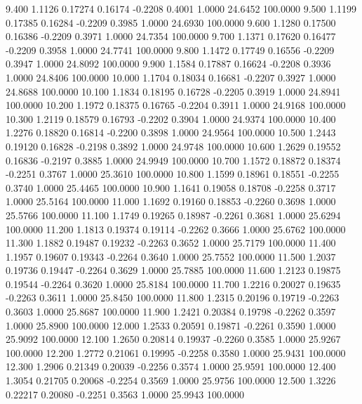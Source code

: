    9.400   1.1126   0.17274   0.16174  -0.2208   0.4001   1.0000  24.6452 100.0000
   9.500   1.1199   0.17385   0.16284  -0.2209   0.3985   1.0000  24.6930 100.0000
   9.600   1.1280   0.17500   0.16386  -0.2209   0.3971   1.0000  24.7354 100.0000
   9.700   1.1371   0.17620   0.16477  -0.2209   0.3958   1.0000  24.7741 100.0000
   9.800   1.1472   0.17749   0.16556  -0.2209   0.3947   1.0000  24.8092 100.0000
   9.900   1.1584   0.17887   0.16624  -0.2208   0.3936   1.0000  24.8406 100.0000
  10.000   1.1704   0.18034   0.16681  -0.2207   0.3927   1.0000  24.8688 100.0000
  10.100   1.1834   0.18195   0.16728  -0.2205   0.3919   1.0000  24.8941 100.0000
  10.200   1.1972   0.18375   0.16765  -0.2204   0.3911   1.0000  24.9168 100.0000
  10.300   1.2119   0.18579   0.16793  -0.2202   0.3904   1.0000  24.9374 100.0000
  10.400   1.2276   0.18820   0.16814  -0.2200   0.3898   1.0000  24.9564 100.0000
  10.500   1.2443   0.19120   0.16828  -0.2198   0.3892   1.0000  24.9748 100.0000
  10.600   1.2629   0.19552   0.16836  -0.2197   0.3885   1.0000  24.9949 100.0000
  10.700   1.1572   0.18872   0.18374  -0.2251   0.3767   1.0000  25.3610 100.0000
  10.800   1.1599   0.18961   0.18551  -0.2255   0.3740   1.0000  25.4465 100.0000
  10.900   1.1641   0.19058   0.18708  -0.2258   0.3717   1.0000  25.5164 100.0000
  11.000   1.1692   0.19160   0.18853  -0.2260   0.3698   1.0000  25.5766 100.0000
  11.100   1.1749   0.19265   0.18987  -0.2261   0.3681   1.0000  25.6294 100.0000
  11.200   1.1813   0.19374   0.19114  -0.2262   0.3666   1.0000  25.6762 100.0000
  11.300   1.1882   0.19487   0.19232  -0.2263   0.3652   1.0000  25.7179 100.0000
  11.400   1.1957   0.19607   0.19343  -0.2264   0.3640   1.0000  25.7552 100.0000
  11.500   1.2037   0.19736   0.19447  -0.2264   0.3629   1.0000  25.7885 100.0000
  11.600   1.2123   0.19875   0.19544  -0.2264   0.3620   1.0000  25.8184 100.0000
  11.700   1.2216   0.20027   0.19635  -0.2263   0.3611   1.0000  25.8450 100.0000
  11.800   1.2315   0.20196   0.19719  -0.2263   0.3603   1.0000  25.8687 100.0000
  11.900   1.2421   0.20384   0.19798  -0.2262   0.3597   1.0000  25.8900 100.0000
  12.000   1.2533   0.20591   0.19871  -0.2261   0.3590   1.0000  25.9092 100.0000
  12.100   1.2650   0.20814   0.19937  -0.2260   0.3585   1.0000  25.9267 100.0000
  12.200   1.2772   0.21061   0.19995  -0.2258   0.3580   1.0000  25.9431 100.0000
  12.300   1.2906   0.21349   0.20039  -0.2256   0.3574   1.0000  25.9591 100.0000
  12.400   1.3054   0.21705   0.20068  -0.2254   0.3569   1.0000  25.9756 100.0000
  12.500   1.3226   0.22217   0.20080  -0.2251   0.3563   1.0000  25.9943 100.0000
